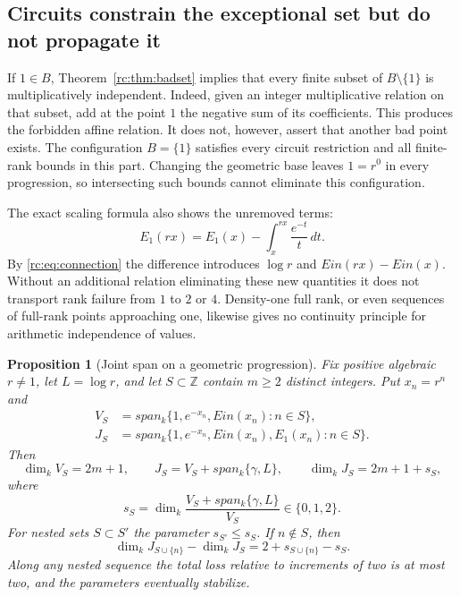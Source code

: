\documentclass[11pt,a4paper]{article}
\newtheorem{proposition}[theorem]{Proposition}
\theoremstyle{definition}
\theoremstyle{remark}
\theoremstyle{plain}
\numberwithin{equation}{section}
\def\operatorname#1{#1}\def\mathrm#1{#1}}
\providecommand{\rcEin}{\operatorname{Ein}}
\providecommand{\rcSpan}{\operatorname{span}}
\providecommand{\rcZ}{\mathbb Z}
\begin{document}
\subsection{Circuits constrain the exceptional set but do not propagate it}

If $1\in B$, Theorem~\ref{rc:thm:badset} implies that every finite
subset of $B\setminus\{1\}$ is multiplicatively independent.  Indeed,
given an integer multiplicative relation on that subset, add at the
point $1$ the negative sum of its coefficients.  This produces the
forbidden affine relation.  It does not, however, assert that another
bad point exists.  The configuration $B=\{1\}$ satisfies every
circuit restriction and all finite-rank bounds in this part.  Changing
the geometric base leaves $1=r^0$ in every progression, so intersecting
such bounds cannot eliminate this configuration.

The exact scaling formula also shows the unremoved terms:
\[
 E_1(rx)=E_1(x)-\int_x^{rx}\frac{e^{-t}}t\,dt.
\]
By \eqref{rc:eq:connection} the difference introduces $\log r$ and
$\rcEin(rx)-\rcEin(x)$.  Without an additional relation eliminating
these new quantities it does not transport rank failure from $1$ to
$2$ or $4$.  Density-one full rank, or even sequences of full-rank
points approaching one, likewise gives no continuity principle for
arithmetic independence of values.

\begin{proposition}[Joint span on a geometric progression]\label{rc:prop:joint}
Fix positive algebraic $r\ne1$, let $L=\log r$, and let
$S\subset\rcZ$ contain $m\ge2$ distinct integers.  Put $x_n=r^n$ and
\begin{align*}
 V_S&=\rcSpan_k\{1,e^{-x_n},\rcEin(x_n):n\in S\},\\
 J_S&=\rcSpan_k\{1,e^{-x_n},\rcEin(x_n),E_1(x_n):n\in S\}.
\end{align*}
Then
\begin{equation}\label{rc:eq:joint-span}
 \dim_k V_S=2m+1,\qquad
 J_S=V_S+\rcSpan_k\{\gamma,L\},\qquad
 \dim_k J_S=2m+1+s_S,
\end{equation}
where
\[
 s_S=\dim_k\frac{V_S+\rcSpan_k\{\gamma,L\}}{V_S}\in\{0,1,2\}.
\]
For nested sets $S\subset S'$ the parameter $s_{S'}\le s_S$.
If $n\notin S$, then
\begin{equation}\label{rc:eq:joint-increment}
 \dim_kJ_{S\cup\{n\}}-\dim_kJ_S
 =2+s_{S\cup\{n\}}-s_S.
\end{equation}
Along any nested sequence the total loss relative to increments of two
is at most two, and the parameters eventually stabilize.
\end{proposition}
\end{document}
